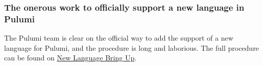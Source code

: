 \subsubsection{The onerous work to officially support a new language in Pulumi}
\label{sssec:off-support-pulumi}
The Pulumi team is clear on the official way to add the support of a new language for Pulumi, and the procedure is long and laborious.
The full procedure can be found on \href{https://github.com/pulumi/pulumi/wiki/New-Language-Bring-up}{New Language Bring Up}.\\
